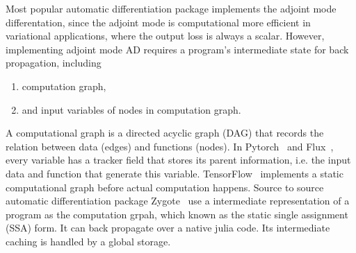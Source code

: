 \documentclass[aps,twocolumn,longbibliography,english,superscriptaddress,prr]{revtex4-1}
\newcommand{\<}{\langle}
\renewcommand{\>}{\rangle}
\theoremstyle{definition}\newtheorem{definition}{\textit{Definition}}
\begin{document}
Most popular automatic differentiation package implements the adjoint mode differentation, since the adjoint mode is computational more efficient in variational applications, where the output loss is always a scalar.
However, implementing adjoint mode AD requires a program's intermediate state for back propagation, including
\begin{enumerate}
    \item computation graph,
    \item and input variables of nodes in computation graph.
\end{enumerate}
    A computational graph is a directed acyclic graph (DAG) that records the relation between data (edges) and functions (nodes).
In Pytorch~\cite{Paszke2017} and Flux~\cite{Innes2018}, every variable has a tracker field that stores its parent information, i.e. the input data and function that generate this variable. TensorFlow~\cite{Tensorflow2015} implements a static computational graph before actual computation happens.
    Source to source automatic differentiation package Zygote~\cite{Innes2018, Innes2019} use a intermediate representation of a program as the computation grpah, which known as the static single assignment (SSA) form. It can back propagate over a native julia code. Its intermediate caching is handled by a global storage.
\end{document}
